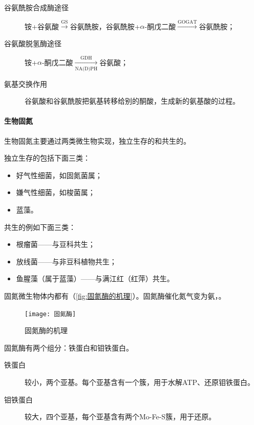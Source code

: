 \begin{description}
	\item[谷氨酰胺合成酶途径] 铵+谷氨酸$\xrightarrow{\text{GS}}$谷氨酰胺，谷氨酰胺+$\alpha$-酮戊二酸$\xrightarrow{\text{GOGAT}}$谷氨酰胺；
	\item[谷氨酸脱氢酶途径] 铵+$\alpha$-酮戊二酸$\xrightarrow[\text{NA(D)PH}]{\text{GDH}}$谷氨酸；
	\item[氨基交换作用] 谷氨酸和谷氨酰胺把氨基转移给别的酮酸，生成新的氨基酸的过程。
\end{description}

\paragraph{生物固氮}

生物固氮主要通过两类微生物实现，独立生存的和共生的。

独立生存的包括下面三类：

\begin{itemize}
	\item 好气性细菌，如固氮菌属；
	\item 嫌气性细菌，如梭菌属；
	\item 蓝藻。
\end{itemize}

共生的例如下面三类：

\begin{itemize}
	\item 根瘤菌——与豆科共生；
	\item 放线菌——与非豆科植物共生；
	\item 鱼腥藻（属于蓝藻）——与满江红（红萍）共生。
\end{itemize}

固氮微生物体内都有（\autoref{fig:固氮酶的机理}）。固氮酶催化氮气变为氨，。

\begin{figure}[htbp]
	\centering
	\texttt{[image: 固氮酶]}
	\caption{固氮酶的机理}
	\label{fig:固氮酶的机理}
\end{figure}


固氮酶有两个组分：铁蛋白和钼铁蛋白。

\begin{description}
	\item[铁蛋白] 较小，两个亚基。每个亚基含有一个簇，用于水解ATP、还原钼铁蛋白。
	\item[钼铁蛋白] 较大，四个亚基，每个亚基含有两个Mo-Fe-S簇，用于还原。
\end{description}

